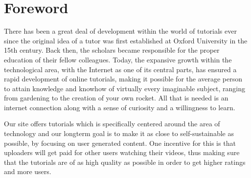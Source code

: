 \section{Foreword}
There has been a great deal of development within the world of tutorials ever since the original idea of a tutor was first established at Oxford University in the 15th century. Back then, the scholars became responsible for the proper education of their fellow colleagues. Today, the expansive growth within the technological area, with the Internet as one of its central parts, has ensured a rapid development of online tutorials, making it possible for the average person to attain knowledge and knowhow of virtually every imaginable subject, ranging from gardening to the creation of your own rocket.
All that is needed is an internet connection along with a sense of curiosity and a willingness to learn.

Our site offers tutorials which is specifically centered around the area of technology and our longterm goal is to make it as close to self-sustainable as possible, by focusing on user generated content. One incentive for this is that uploaders will get paid for other users watching their videos, thus making sure that the tutorials are of as high quality as possible in order to get higher ratings and more users.